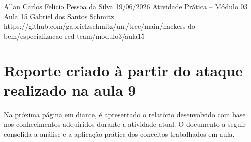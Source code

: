 \documentclass{article}
\begin{document}
{Allan Carlos Felício Pessoa da Silva}
{19/06/2026}
{Atividade Prática -- Módulo 03}
{Aula 15}
{Gabriel dos Santos Schmitz}
{https://github.com/gabrielzschmitz/uni/tree/main/hackers-do-bem/especializacao-red-team/modulo3/aula15}





\section{Reporte criado à partir do ataque realizado na aula 9}

\paragraph{}
Na próxima página em diante, é apresentado o relatório desenvolvido com base
nos conhecimentos adquiridos durante a atividade atual. O documento a seguir
consolida a análise e a aplicação prática dos conceitos trabalhados em aula.

\newpage


\newpage
\printbibliography[title=Referências]
\end{document}
